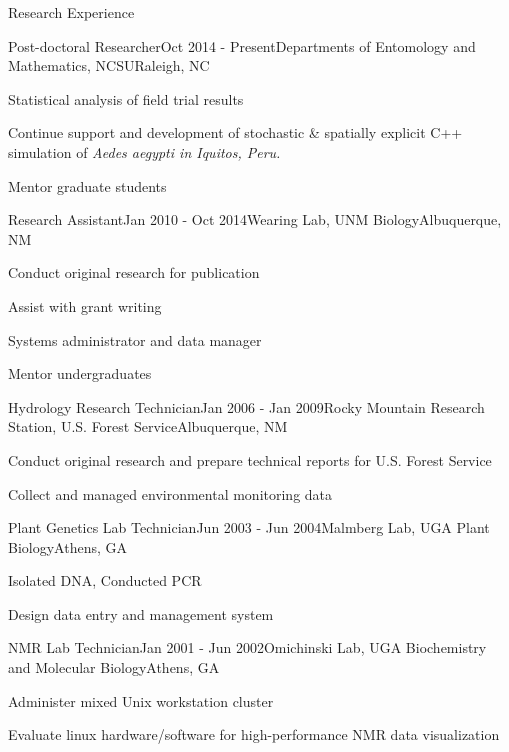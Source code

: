 \documentclass{resume} %
\begin{document}
\begin{rSection}{Research Experience}

\begin{rSubsection}{Post-doctoral Researcher}{Oct 2014 - Present}{Departments of
Entomology and Mathematics, NCSU}{Raleigh, NC}
\item Statistical analysis of field trial results
\item Continue support and development of stochastic \& spatially explicit
C++ simulation of \em{Aedes aegypti} in Iquitos, Peru.
\item Mentor graduate students
\end{rSubsection}

\begin{rSubsection}{Research Assistant}{Jan 2010 - Oct 2014}{Wearing Lab, UNM Biology}{Albuquerque, NM}
\item Conduct original research for publication
\item Assist with grant writing
\item Systems administrator and data manager
\item Mentor undergraduates
\end{rSubsection}

\begin{rSubsection}{Hydrology Research Technician}{Jan 2006 - Jan 2009}{Rocky
Mountain Research Station, U.S. Forest Service}{Albuquerque, NM}
\item Conduct original research and prepare technical reports for U.S. Forest Service
\item Collect and managed environmental monitoring data 
\end{rSubsection}

\begin{rSubsection}{Plant Genetics Lab Technician}{Jun 2003 - Jun 2004}{Malmberg Lab, UGA Plant Biology}{Athens, GA}
\item Isolated DNA, Conducted PCR
\item Design data entry and management system
\end{rSubsection}

\begin{rSubsection}{NMR Lab Technician}{Jan 2001 - Jun 2002}{Omichinski Lab, UGA
Biochemistry and Molecular Biology}{Athens, GA}
\item Administer mixed Unix workstation cluster
\item Evaluate linux hardware/software for high-performance NMR data visualization
\end{rSubsection}
\end{rSection}
\end{document}

